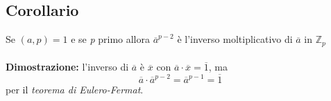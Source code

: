 \subsection{Corollario}
Se \((a,p)=1\) e se \textit{p} primo allora \(\overline{a}^{p-2}\) è l'inverso moltiplicativo di \(\overline{a}\) in \(\mathbb{Z}_p\)
\\\\
\textbf{Dimostrazione:} l'inverso di \(\overline{a}\) è \(\overline{x}\) con \(\overline{a}\cdot\overline{x}=\overline{1}\), 
ma \[\overline{a}\cdot\overline{a}^{p-2}=\overline{a}^{p-1}=\overline{1}\]
per il \textit{teorema di Eulero-Fermat}.
